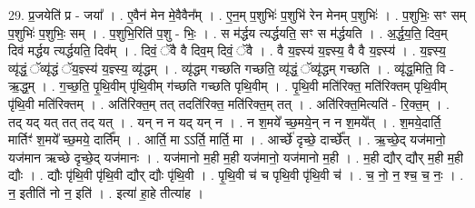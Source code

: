 \documentclass[17pt]{extarticle}
\begin{document}
29. प्र॒जयेति॑ प्र - जया᳚ । . ए॒वैन॑ मेन मे॒वैवैन᳚म् । . ए॒न॒म् प॒शुभिः॑ प॒शुभि॑ रेन मेनम् प॒शुभिः॑ । . प॒शुभिः॒ सꣳ सम् प॒शुभिः॑ प॒शुभिः॒ सम् । . प॒शुभि॒रिति॑ प॒शु - भिः॒ । . स म॑र्द्धय त्यर्द्धयति॒ सꣳ स म॑र्द्धयति । . अ॒र्द्ध॒य॒ति॒ दिव॒म् दिव॑ मर्द्धय त्यर्द्धयति॒ दिव᳚म् । . दिवं॒ ॅवै वै दिव॒म् दिवं॒ ॅवै । . वै य॒ज्ञ्स्य॑ य॒ज्ञ्स्य॒ वै वै य॒ज्ञ्स्य॑ । . य॒ज्ञ्स्य॒ व्यृ॑द्धं॒ ॅव्यृ॑द्धं ॅय॒ज्ञ्स्य॑ य॒ज्ञ्स्य॒ व्यृ॑द्धम् । . व्यृ॑द्धम् गच्छति गच्छति॒ व्यृ॑द्धं॒ ॅव्यृ॑द्धम् गच्छति । . व्यृ॑द्ध॒मिति॒ वि - ऋ॒द्ध॒म् । . ग॒च्छ॒ति॒ पृ॒थि॒वीम् पृ॑थि॒वीम् ग॑च्छति गच्छति पृथि॒वीम् । . पृ॒थि॒वी मति॑रिक्त॒ मति॑रिक्तम् पृथि॒वीम् पृ॑थि॒वी मति॑रिक्तम् । . अति॑रिक्त॒म् तत् तदति॑रिक्त॒ मति॑रिक्त॒म् तत् । . अति॑रिक्त॒मित्यति॑ - रि॒क्त॒म् । . तद् यद् यत् तत् तद् यत् । . यन् न न यद् यन् न । . न श॒मये᳚ च्छ॒मये॒न् न न श॒मये᳚त् । . श॒मये॒दार्ति॒ मार्तिꣳ॑ श॒मये᳚ च्छ॒मये॒ दार्ति᳚म् । . आर्ति॒ मा ऽऽर्ति॒ मार्ति॒ मा । . आर्च्छे॑ दृच्छे॒ दार्च्छे᳚त् । . ऋ॒च्छे॒द् यज॑मानो॒ यज॑मान ऋच्छे दृच्छे॒द् यज॑मानः । . यज॑मानो म॒ही म॒ही यज॑मानो॒ यज॑मानो म॒ही । . म॒ही द्यौर् द्यौर् म॒ही म॒ही द्यौः । . द्यौः पृ॑थि॒वी पृ॑थि॒वी द्यौर् द्यौः पृ॑थि॒वी । . पृ॒थि॒वी च॑ च पृथि॒वी पृ॑थि॒वी च॑ । . च॒ नो॒ न॒ श्च॒ च॒ नः॒ । . न॒ इतीति॑ नो न॒ इति॑ । . इत्या॑ हा॒हे तीत्या॑ह । \newline
\end{document}
